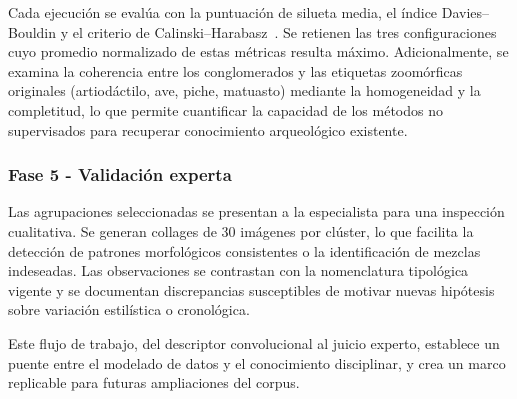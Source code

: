 Cada ejecución se evalúa con la puntuación de silueta media, el índice Davies–Bouldin y el criterio de Calinski–Harabasz~\citep{rousseeuw1987silhouettes,davies1979cluster,calinski1974dendrite}.
Se retienen las tres configuraciones cuyo promedio normalizado de estas métricas resulta máximo.
Adicionalmente, se examina la coherencia entre los conglomerados y las etiquetas zoomórficas originales (artiodáctilo, ave, piche, matuasto) mediante la homogeneidad y la completitud, lo que permite cuantificar la capacidad de los métodos no supervisados para recuperar conocimiento arqueológico existente.

\subsubsection*{Fase 5 - Validación experta}

Las agrupaciones seleccionadas se presentan a la especialista para una inspección cualitativa.
Se generan collages de 30 imágenes por clúster, lo que facilita la detección de patrones morfológicos consistentes o la identificación de mezclas indeseadas.
Las observaciones se contrastan con la nomenclatura tipológica vigente y se documentan discrepancias susceptibles de motivar nuevas hipótesis sobre variación estilística o cronológica.

Este flujo de trabajo, del descriptor convolucional al juicio experto, establece un puente entre el modelado de datos y el conocimiento disciplinar, y crea un marco replicable para futuras ampliaciones del corpus.

\newpage

